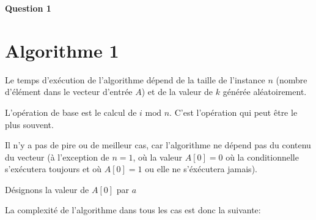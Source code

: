 \documentclass[class=article]{standalone}
\begin{document}
\centerline{\Huge \bf Question 1}
\bigskip

\section*{Algorithme 1}

Le temps d'exécution de l'algorithme dépend de la taille de l'instance $n$ 
(nombre d'élément dans le vecteur d'entrée $A$)
et de la valeur de $k$ générée aléatoirement. 

L'opération de base est le calcul de $i\text{ mod }n$. 
C'est l'opération qui peut être le plus souvent.

Il n'y a pas de pire ou de meilleur cas, 
car l'algorithme ne dépend pas du contenu du vecteur (à l'exception de $n=1$,
où la valeur $A[0]=0$ où la conditionnelle s'exécutera toujours et où $A[0] = 1$ ou elle ne s'éxécutera jamais).

Désignons la valeur de $A[0]$ par $a$

La complexité de l'algorithme dans tous les cas est donc la suivante:
\end{document}
